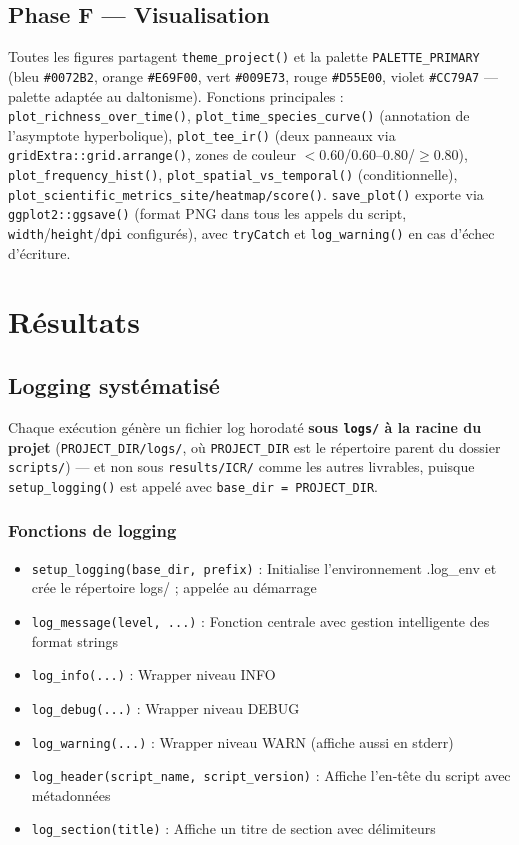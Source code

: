 \documentclass[11pt,a4paper]{article}
\begin{document}
\subsection{Phase F --- Visualisation}
Toutes les figures partagent \texttt{theme\_project()} et la palette \texttt{PALETTE\_PRIMARY}
(bleu \texttt{\#0072B2}, orange \texttt{\#E69F00}, vert \texttt{\#009E73}, rouge \texttt{\#D55E00},
violet \texttt{\#CC79A7} --- palette adaptée au daltonisme). Fonctions principales :
\texttt{plot\_richness\_over\_time()}, \texttt{plot\_time\_species\_curve()} (annotation de
l'asymptote hyperbolique), \texttt{plot\_tee\_ir()} (deux panneaux via
\texttt{gridExtra::grid.arrange()}, zones de couleur $<0.60$/$0.60$--$0.80$/$\ge 0.80$),
\texttt{plot\_frequency\_hist()}, \texttt{plot\_spatial\_vs\_temporal()} (conditionnelle),
\texttt{plot\_scientific\_metrics\_site/heatmap/score()}. \texttt{save\_plot()} exporte via
\texttt{ggplot2::ggsave()} (format PNG dans tous les appels du script, \texttt{width}/\texttt{height}/\texttt{dpi} configurés), avec \texttt{tryCatch} et \texttt{log\_warning()} en cas d'échec d'écriture.

\section{Résultats}

\subsection{Logging systématisé}
Chaque exécution génère un fichier log horodaté \textbf{sous \texttt{logs/} à la racine du
projet} (\texttt{PROJECT\_DIR/logs/}, où \texttt{PROJECT\_DIR} est le répertoire parent du
dossier \texttt{scripts/}) --- et non sous \texttt{results/ICR/} comme les autres livrables,
puisque \texttt{setup\_logging()} est appelé avec \texttt{base\_dir = PROJECT\_DIR}.

\subsubsection{Fonctions de logging}
\begin{itemize}
  \item \texttt{setup\_logging(base\_dir, prefix)} : Initialise l'environnement .log\_env et crée le répertoire logs/ ; appelée au démarrage
  \item \texttt{log\_message(level, ...)} : Fonction centrale avec gestion intelligente des format strings
  \item \texttt{log\_info(...)} : Wrapper niveau INFO
  \item \texttt{log\_debug(...)} : Wrapper niveau DEBUG
  \item \texttt{log\_warning(...)} : Wrapper niveau WARN (affiche aussi en stderr)
  \item \texttt{log\_header(script\_name, script\_version)} : Affiche l'en-t\^ete du script avec métadonnées
  \item \texttt{log\_section(title)} : Affiche un titre de section avec délimiteurs
\end{itemize}
\end{document}
